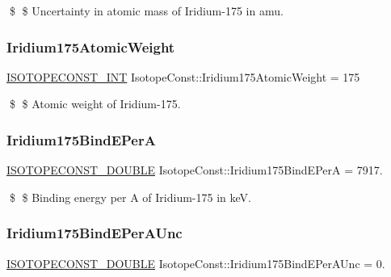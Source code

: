 \$ \$ Uncertainty in atomic mass of Iridium-\/175 in amu. \mbox{\label{group___isotope_const-_iridium-_ir175_gae40874c43a69a1df628be902ed164263}} 
\subsubsection{\texorpdfstring{Iridium175\+Atomic\+Weight}{Iridium175AtomicWeight}}
{\footnotesize\ttfamily \mbox{\hyperlink{group___isotope_const-_macros_ga5f18360b3e99483a35c32d789e62621c}{I\+S\+O\+T\+O\+P\+E\+C\+O\+N\+S\+T\+\_\+\+I\+NT}} Isotope\+Const\+::\+Iridium175\+Atomic\+Weight = 175}

\$ \$ Atomic weight of Iridium-\/175. \mbox{\label{group___isotope_const-_iridium-_ir175_ga967c227f83c548a9e321b50f20d98d36}} 
\subsubsection{\texorpdfstring{Iridium175\+Bind\+E\+PerA}{Iridium175BindEPerA}}
{\footnotesize\ttfamily \mbox{\hyperlink{group___isotope_const-_macros_ga8f45a7272ce02c0b4c65c44636ed719a}{I\+S\+O\+T\+O\+P\+E\+C\+O\+N\+S\+T\+\_\+\+D\+O\+U\+B\+LE}} Isotope\+Const\+::\+Iridium175\+Bind\+E\+PerA = 7917.}

\$ \$ Binding energy per A of Iridium-\/175 in keV. \mbox{\label{group___isotope_const-_iridium-_ir175_ga396a19049d1a72ad4c4805872696b43f}} 
\subsubsection{\texorpdfstring{Iridium175\+Bind\+E\+Per\+A\+Unc}{Iridium175BindEPerAUnc}}
{\footnotesize\ttfamily \mbox{\hyperlink{group___isotope_const-_macros_ga8f45a7272ce02c0b4c65c44636ed719a}{I\+S\+O\+T\+O\+P\+E\+C\+O\+N\+S\+T\+\_\+\+D\+O\+U\+B\+LE}} Isotope\+Const\+::\+Iridium175\+Bind\+E\+Per\+A\+Unc = 0.}

